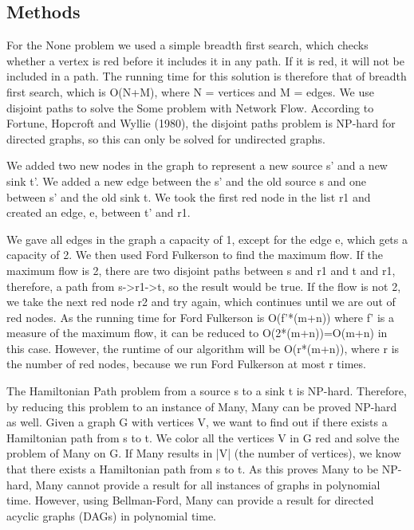 \documentclass{tufte-handout}
\begin{document}
\subsection{Methods}

For the None problem we used a simple breadth first search, which checks whether
a vertex is red before it includes it in any path. If it is red, it will not 
be included in a path.
The running time for this solution is therefore that of breadth first search,
which is O(N+M), where N = vertices and M = edges. We use disjoint paths to solve the Some problem with Network Flow. 
According to Fortune, Hopcroft and Wyllie (1980), the disjoint paths problem is NP-hard for directed graphs, so this can only be solved for undirected graphs.

\clearpage

We added two new nodes in the graph to represent a new source s’ and a new sink t’. 
We added a new edge between the s’ and the old source s and one between s’ and the old sink t.
We took the first red node in the list r1 and created an edge, e, between t’ and r1.  

We gave all edges in the graph a capacity of 1, except for the edge e, which gets a capacity of 2. 
We then used Ford Fulkerson to find the maximum flow. 
If the maximum flow is 2, there are two disjoint paths between s and r1 and t and r1, therefore, a path from s->r1->t, so the result would be true. 
If the flow is not 2, we take the next red node r2 and try again, which continues until we are out of red nodes. 
As the running time for Ford Fulkerson is O(f’*(m+n)) where f’ is a measure of the maximum flow, it can be reduced to O(2*(m+n))=O(m+n) in this case. 
However, the runtime of our algorithm will be O(r*(m+n)), where r is the number of red nodes, because we run Ford Fulkerson at most r times.  

\medskip

The Hamiltonian Path problem from a source s to a sink t is NP-hard.
Therefore, by reducing this problem to an instance of Many, Many can be proved NP-hard as well.
Given a graph G with vertices V, we want to find out if there exists a Hamiltonian path from s to t. 
We color all the vertices V in G red and solve the problem of Many on G.
If Many results in |V| (the number of vertices), we know that there exists a Hamiltonian path from s to t. 
As this proves Many to be NP-hard, Many cannot provide a result for all instances of graphs in polynomial time. 
However, using Bellman-Ford, Many can provide a result for directed acyclic graphs (DAGs) in polynomial time. 
\end{document}
